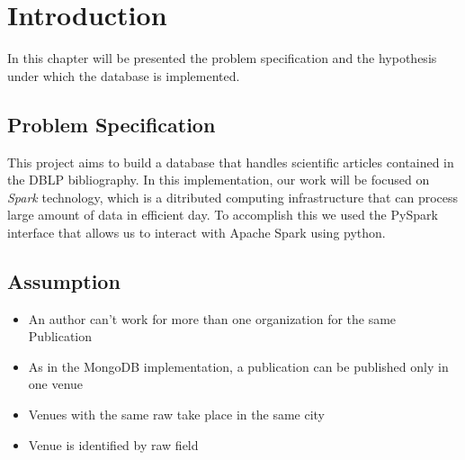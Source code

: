 \documentclass{Configuration_Files/PoliMi3i_thesis}
\begin{document}
\mainmatter %

\chapter{Introduction}
\label{ch:introduction}
In this chapter will be presented the problem specification and the hypothesis under which the database is implemented.

\section{Problem Specification}
This project aims to build a database that handles scientific articles contained in the DBLP bibliography. In this implementation,
our work will be focused on \emph{Spark} technology, which is a ditributed computing infrastructure that can process large amount of data in efficient day. To accomplish this we used the PySpark interface that allows us to interact with Apache Spark using python. 

\section{Assumption}
\begin{itemize}
    \item An author can't work for more than one organization for the same Publication
    \item As in the MongoDB implementation, a publication can be published only in one venue
    \item Venues with the same raw take place in the same city
    \item Venue is identified by raw field
\end{itemize}
\end{document}

